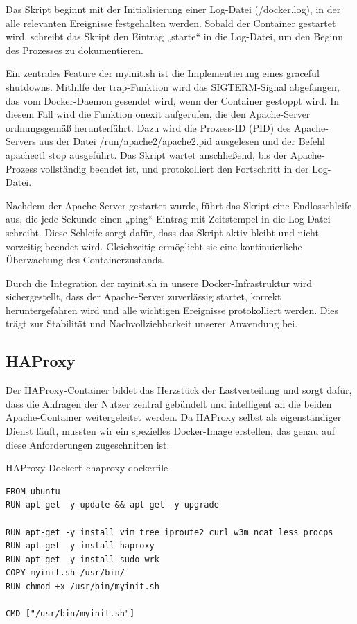 Das Skript beginnt mit der Initialisierung einer Log-Datei (/docker.log), in der alle relevanten Ereignisse festgehalten werden. Sobald der Container gestartet wird, schreibt das Skript den Eintrag „starte“ in die Log-Datei, um den Beginn des Prozesses zu dokumentieren.

Ein zentrales Feature der myinit.sh ist die Implementierung eines graceful shutdowns. Mithilfe der trap-Funktion wird das SIGTERM-Signal abgefangen, das vom Docker-Daemon gesendet wird, wenn der Container gestoppt wird. In diesem Fall wird die Funktion onexit aufgerufen, die den Apache-Server ordnungsgemäß herunterfährt. Dazu wird die Prozess-ID (PID) des Apache-Servers aus der Datei /run/apache2/apache2.pid ausgelesen und der Befehl apachectl stop ausgeführt. Das Skript wartet anschließend, bis der Apache-Prozess vollständig beendet ist, und protokolliert den Fortschritt in der Log-Datei.

Nachdem der Apache-Server gestartet wurde, führt das Skript eine Endlosschleife aus, die jede Sekunde einen „ping“-Eintrag mit Zeitstempel in die Log-Datei schreibt. Diese Schleife sorgt dafür, dass das Skript aktiv bleibt und nicht vorzeitig beendet wird. Gleichzeitig ermöglicht sie eine kontinuierliche Überwachung des Containerzustands.

Durch die Integration der myinit.sh in unsere Docker-Infrastruktur wird sichergestellt, dass der Apache-Server zuverlässig startet, korrekt heruntergefahren wird und alle wichtigen Ereignisse protokolliert werden. Dies trägt zur Stabilität und Nachvollziehbarkeit unserer Anwendung bei.


\subsection{HAProxy}
Der HAProxy-Container bildet das Herzstück der Lastverteilung und sorgt dafür, dass die Anfragen der Nutzer zentral gebündelt und intelligent an die beiden Apache-Container weitergeleitet werden. Da HAProxy selbst als eigenständiger Dienst läuft, mussten wir ein spezielles Docker-Image erstellen, das genau auf diese Anforderungen zugeschnitten ist.  

\begin{code}{HAProxy Dockerfile}{haproxy dockerfile}
        \begin{verbatim}
FROM ubuntu
RUN apt-get -y update && apt-get -y upgrade

RUN apt-get -y install vim tree iproute2 curl w3m ncat less procps
RUN apt-get -y install haproxy
RUN apt-get -y install sudo wrk
COPY myinit.sh /usr/bin/
RUN chmod +x /usr/bin/myinit.sh

CMD ["/usr/bin/myinit.sh"]
  \end{verbatim}
\end{code}


